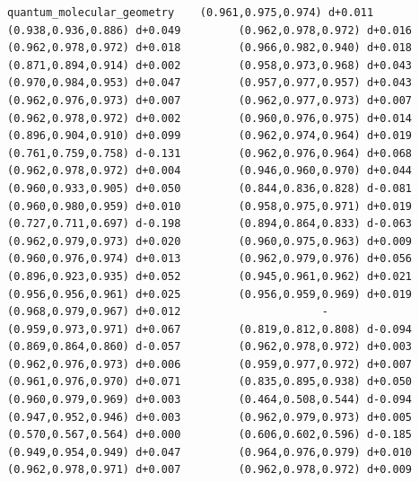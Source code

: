 \documentclass[11pt, letterpaper, openany]{book}
\begin{document}
\begin{empiricalbox}
\begin{lstlisting}[style=terminal]
quantum_molecular_geometry    (0.961,0.975,0.974) d+0.011         (0.938,0.936,0.886) d+0.049         (0.962,0.978,0.972) d+0.016         (0.962,0.978,0.972) d+0.018         (0.966,0.982,0.940) d+0.018         (0.871,0.894,0.914) d+0.002         (0.958,0.973,0.968) d+0.043         (0.970,0.984,0.953) d+0.047         (0.957,0.977,0.957) d+0.043         (0.962,0.976,0.973) d+0.007         (0.962,0.977,0.973) d+0.007         (0.962,0.978,0.972) d+0.002         (0.960,0.976,0.975) d+0.014         (0.896,0.904,0.910) d+0.099         (0.962,0.974,0.964) d+0.019         (0.761,0.759,0.758) d-0.131         (0.962,0.976,0.964) d+0.068         (0.962,0.978,0.972) d+0.004         (0.946,0.960,0.970) d+0.044         (0.960,0.933,0.905) d+0.050         (0.844,0.836,0.828) d-0.081         (0.960,0.980,0.959) d+0.010         (0.958,0.975,0.971) d+0.019         (0.727,0.711,0.697) d-0.198         (0.894,0.864,0.833) d-0.063         (0.962,0.979,0.973) d+0.020         (0.960,0.975,0.963) d+0.009         (0.960,0.976,0.974) d+0.013         (0.962,0.979,0.976) d+0.056         (0.896,0.923,0.935) d+0.052         (0.945,0.961,0.962) d+0.021         (0.956,0.956,0.961) d+0.025         (0.956,0.959,0.969) d+0.019         (0.968,0.979,0.967) d+0.012                      -                      (0.959,0.973,0.971) d+0.067         (0.819,0.812,0.808) d-0.094         (0.869,0.864,0.860) d-0.057         (0.962,0.978,0.972) d+0.003         (0.962,0.976,0.973) d+0.006         (0.959,0.977,0.972) d+0.007         (0.961,0.976,0.970) d+0.071         (0.835,0.895,0.938) d+0.050         (0.960,0.979,0.969) d+0.003         (0.464,0.508,0.544) d-0.094         (0.947,0.952,0.946) d+0.003         (0.962,0.979,0.973) d+0.005         (0.570,0.567,0.564) d+0.000         (0.606,0.602,0.596) d-0.185         (0.949,0.954,0.949) d+0.047         (0.964,0.976,0.979) d+0.010         (0.962,0.978,0.971) d+0.007         (0.962,0.978,0.972) d+0.009     

\end{lstlisting}
\end{empiricalbox}
\end{document}
